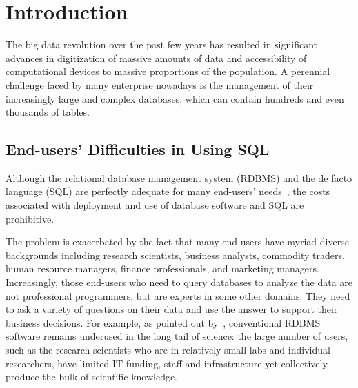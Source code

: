 \section{Introduction}
\label{sec:introduction}


The big data revolution over the past few years has resulted
in significant advances in digitization of massive amounts
of data and accessibility of computational devices to massive
proportions of the population. A perennial challenge faced by many
enterprise nowadays is the management
of their increasingly large and complex databases, which can contain
hundreds and even thousands of tables. 




\subsection{End-users' Difficulties in Using SQL}
Although the relational database management system (RDBMS) and the
de facto language (SQL) are perfectly adequate for many end-users'
needs~\cite{Howe:2011}, the costs associated with deployment and
use of database software and SQL are prohibitive. 

The problem is exacerbated by the fact that many end-users
have myriad diverse backgrounds including research scientists,
business analysts, commodity traders, human resource managers,
finance professionals, and marketing managers. Increasingly,
those end-users who need to query databases to analyze the
data are not professional programmers, but are experts in some
other domains. They need to ask a variety of questions on their
data and use the answer to support their business decisions.
For example, as pointed out
by~\cite{Gray:2005}, conventional RDBMS software remains underused
in the long tail of science: the large number of users, such as the
research scientists who are in relatively small labs and individual
researchers, have limited IT funding, staff and infrastructure yet
collectively produce the bulk of scientific knowledge. 


